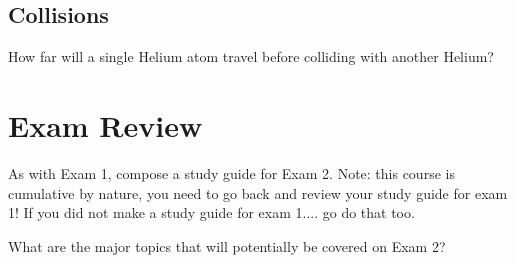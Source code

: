 \documentclass{article}
\begin{document}
\subsection{Collisions}
How far will a single Helium atom travel before colliding with another Helium?

\section{Exam Review}
As with Exam 1, compose a study guide for Exam 2. 
Note: this course is cumulative by nature, you need to go back and review your study guide for exam 1!
If you did not make a study guide for exam 1.... go do that too. 

What are the major topics that will potentially be covered on Exam 2?
\end{document}
